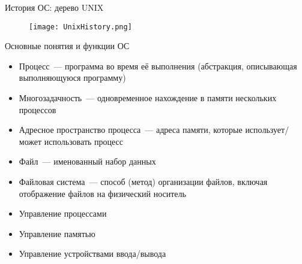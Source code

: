 \documentclass[aspectratio=169,14pt]{beamer}
\begin{document}
\begin{frame}{История ОС: дерево UNIX}
    \begin{figure}[htp]
        \centering
        \texttt{[image: UnixHistory.png]}
    \end{figure}
\end{frame}

\begin{frame}{Основные понятия и функции ОС}
    \begin{itemize}
        \item Процесс~--- программа во время её выполнения (абстракция,
        описывающая выполняющуюся программу)
        \item Многозадачность~--- одновременное нахождение в памяти
        нескольких процессов
        \item Адресное пространство процесса~--- адреса памяти, которые
        использует/может использовать процесс
        \item Файл~--- именованный набор данных
        \item Файловая система~--- способ (метод) организации файлов, включая
        отображение файлов на физический носитель
        \item Управление процессами
        \item Управление памятью
        \item Управление устройствами ввода/вывода
    \end{itemize}
\end{frame}
\end{document}
